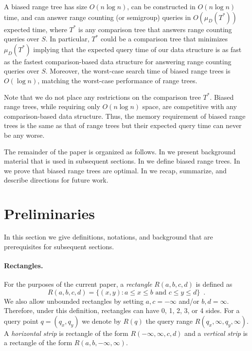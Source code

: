 \documentclass[charterfonts]{patmorin}
\begin{document}
A biased range tree has size $O(n\log n)$, can be constructed in
$O(n\log n)$ time, and can answer range counting (or semigroup)
queries in $O(\mu_D(T^*))$ expected time, where $T^*$ is any
comparison tree that answers range counting queries over $S$.  In
particular, $T^*$ could be a comparison tree that minimizes
$\mu_D(T^*)$ implying that the expected query time of our data
structure is as fast as the fastest comparison-based data structure
for answering range counting queries over $S$.  Moreover, the
worst-case search time of biased range trees is $O(\log n)$, matching
the worst-case performance of range trees.

Note that we do not place any restrictions on the comparison tree
$T^*$.  Biased range trees, while requiring only $O(n\log n)$ space,
are competitive with any comparison-based data structure.  Thus, the
memory requirement of biased range trees is the same as that of range
trees but their expected query time can never be any worse.
 
The remainder of the paper is organized as follows. In
 we present background material that is used in
subsequent sections.  In  we define biased
range trees. In  we prove that biased range trees
are optimal.  In  we recap, summarize, and describe
directions for future work.

\section{Preliminaries}


In this section we give definitions, notations, and background
that are prerequisites for subsequent sections.

\paragraph{Rectangles.}

For the purposes of the current paper, a \emph{rectangle}
$R(a,b,c,d)$ is defined as
\[
    R(a,b,c,d) = \{ (x,y) : \mbox{$a\le  x \le b$ and $c \le y \le d$}\}
	\enspace .
\]
We also allow unbounded rectangles by setting $a,c=-\infty$ and/or
$b,d=\infty$.  Therefore, under this definition, rectangles can have
0, 1, 2, 3, or 4 sides.  For a query point $q=(q_x,q_y)$ we denote 
by $R(q)$ the query range $R(q_x,\infty,q_y,\infty)$.  A
\emph{horizontal strip} is rectangle of the form
$R(-\infty,\infty,c,d)$ and a \emph{vertical strip} is a rectangle of
the form $R(a,b,-\infty,\infty)$.
\end{document}
